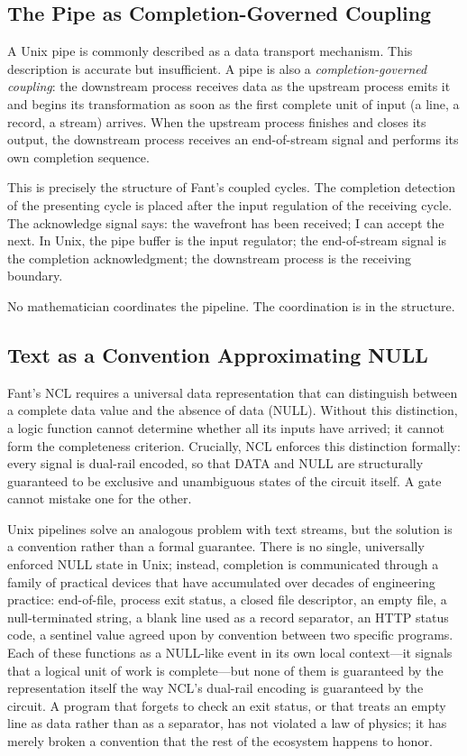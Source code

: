 \documentclass[12pt, a4paper]{article}
\begin{document}
\subsection{The Pipe as Completion-Governed Coupling}

A Unix pipe is commonly described as a data transport mechanism. This
description is accurate but insufficient. A pipe is also a
\emph{completion-governed coupling}: the downstream process receives
data as the upstream process emits it and begins its transformation
as soon as the first complete unit of input (a line, a record, a
stream) arrives. When the upstream process finishes and closes its
output, the downstream process receives an end-of-stream signal and
performs its own completion sequence.

This is precisely the structure of Fant's coupled cycles. The
completion detection of the presenting cycle is placed after the input
regulation of the receiving cycle. The acknowledge signal says: the
wavefront has been received; I can accept the next. In Unix, the pipe
buffer is the input regulator; the end-of-stream signal is the
completion acknowledgment; the downstream process is the receiving
boundary.

No mathematician coordinates the pipeline. The coordination is in the
structure.

\subsection{Text as a Convention Approximating NULL}

Fant's NCL requires a universal data representation that can
distinguish between a complete data value and the absence of data
(NULL). Without this distinction, a logic function cannot determine
whether all its inputs have arrived; it cannot form the completeness
criterion. Crucially, NCL enforces this distinction formally: every
signal is dual-rail encoded, so that DATA and NULL are structurally
guaranteed to be exclusive and unambiguous states of the circuit
itself. A gate cannot mistake one for the other.

Unix pipelines solve an analogous problem with text streams, but
the solution is a convention rather than a formal guarantee. There
is no single, universally enforced NULL state in Unix; instead,
completion is communicated through a family of practical devices
that have accumulated over decades of engineering practice:
end-of-file, process exit status, a closed file descriptor, an
empty file, a null-terminated string, a blank line used as a
record separator, an HTTP status code, a sentinel value agreed
upon by convention between two specific programs. Each of these
functions as a NULL-like event in its own local context---it
signals that a logical unit of work is complete---but none of
them is guaranteed by the representation itself the way NCL's
dual-rail encoding is guaranteed by the circuit. A program that
forgets to check an exit status, or that treats an empty line as
data rather than as a separator, has not violated a law of
physics; it has merely broken a convention that the rest of the
ecosystem happens to honor.
\end{document}
